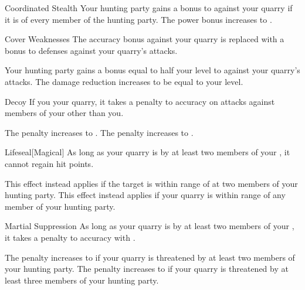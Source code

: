 {\begin{freeability}{Coordinated Stealth}
                \rankline
                 Your hunting party gains a  bonus to  against your quarry if it is \unaware of every member of the hunting party.
                 The power bonus increases to .
            \end{freeability}

            \begin{freeability}{Cover Weaknesses}
                The accuracy bonus against your quarry is replaced with a  bonus to defenses against your quarry's attacks.

                \rankline
                 Your hunting party gains a bonus equal to half your level to  against your quarry's attacks.
                 The damage reduction increases to be equal to your level.
            \end{freeability}

            \begin{freeability}{Decoy}
                If you  your quarry, it takes a  penalty to accuracy on attacks against members of your  other than you.

                \rankline
                 The penalty increases to .
                 The penalty increases to .
            \end{freeability}

            \begin{freeability}{Lifeseal}[Magical]
                As long as your quarry is  by at least two members of your , it cannot regain hit points.

                \rankline
                 This effect instead applies if the target is within \rngmed range of at two members of your hunting party.
                 This effect instead applies if your quarry is within \rnglong range of any member of your hunting party.
            \end{freeability}

            \begin{freeability}{Martial Suppression}
                As long as your quarry is  by at least two members of your , it takes a  penalty to accuracy with .

                \rankline
                 The penalty increases to  if your quarry is threatened by at least two members of your hunting party.
                 The penalty increases to  if your quarry is threatened by at least three members of your hunting party.
            \end{freeability}

}
